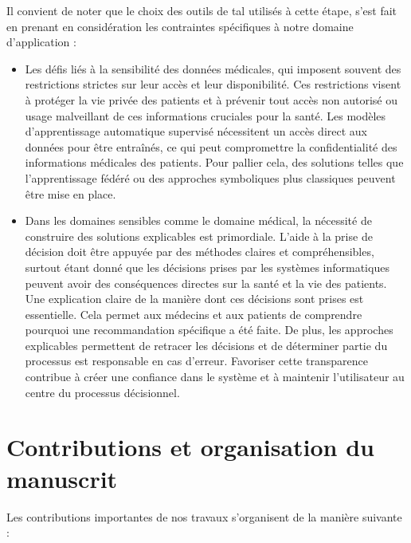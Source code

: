 Il convient de noter que le choix des outils de \gls{tal} utilisés à cette étape, s'est fait en prenant en considération les contraintes spécifiques à notre domaine d'application :
\begin{itemize}
    \item Les défis liés à la sensibilité des données médicales, qui imposent souvent des restrictions strictes sur leur accès et leur disponibilité.
    Ces restrictions visent à protéger la vie privée des patients et à prévenir tout accès non autorisé ou usage malveillant de ces informations cruciales pour la santé.
    Les modèles d'apprentissage automatique supervisé nécessitent un accès direct aux données pour être entraînés, ce qui peut compromettre la confidentialité des informations médicales des patients.
    Pour pallier cela, des solutions telles que l'apprentissage fédéré ou des approches symboliques plus classiques peuvent être mise en place.

    \item Dans les domaines sensibles comme le domaine médical, la nécessité de construire des solutions explicables est primordiale.
    L'aide à la prise de décision doit être appuyée par des méthodes claires et compréhensibles, surtout étant donné que les décisions prises par les systèmes informatiques peuvent avoir des conséquences directes sur la santé et la vie des patients.
    Une explication claire de la manière dont ces décisions sont prises est essentielle.
    Cela permet aux médecins et aux patients de comprendre pourquoi une recommandation spécifique a été faite.
    De plus, les approches explicables permettent de retracer les décisions et de déterminer partie du processus est responsable en cas d'erreur.
    Favoriser cette transparence contribue à créer une confiance dans le système et à maintenir l'utilisateur au centre du processus décisionnel.
\end{itemize}

\FloatBarrier
\section{Contributions et organisation du manuscrit}

\noindent
Les contributions importantes de nos travaux s'organisent de la manière suivante :

